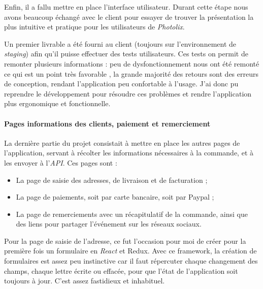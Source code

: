 \documentclass[12pt,a4paper]{article}
\providecommand{\tightlist}{%
  \setlength{\itemsep}{0pt}\setlength{\parskip}{0pt}}
\begin{document}
  Enfin, il a fallu mettre en place l'interface utilisateur. Durant cette
  étape nous avons beaucoup échangé avec le client pour essayer de trouver
  la présentation la plus intuitive et pratique pour les utilisateurs de
  \emph{Photolix}.

  Un premier livrable a été fourni au client (toujours sur l'environnement
  de \emph{staging}) afin qu'il puisse effectuer des tests utilisateurs.
  Ces tests on permit de remonter plusieurs informations : peu de
  dysfonctionnement nous ont été remonté ce qui est un point très
  favorable , la grande majorité des retours sont des erreurs de
  conception, rendant l'application peu confortable à l'usage. J'ai donc
  pu reprendre le développement pour résoudre ces problèmes et rendre
  l'application plus ergonomique et fonctionnelle.

  \paragraph{Pages informations des clients, paiement et
  remerciement}\label{pages-informations-des-clients-paiement-et-remerciement}

  \bigskip

  La dernière partie du projet consistait à mettre en place les autres
  pages de l'application, servant à récolter les informations nécessaires
  à la commande, et à les envoyer à l'\emph{API}. Ces pages sont :

  \begin{itemize}
  \tightlist
  \item
    La page de saisie des adresses, de livraison et de facturation ;
  \item
    La page de paiements, soit par carte bancaire, soit par Paypal ;
  \item
    La page de remerciements avec un récapitulatif de la commande, ainsi
    que des liens pour partager l'événement sur les réseaux sociaux.
  \end{itemize}

  \bigskip

  Pour la page de saisie de l'adresse, ce fut l'occasion pour moi de créer
  pour la première fois un formulaire en \emph{React} et Redux. Avec ce
  framework, la création de formulaires est assez peu instinctive car il
  faut répercuter chaque changement des champs, chaque lettre écrite ou
  effacée, pour que l'état de l'application soit toujours à jour. C'est
  assez fastidieux et inhabituel.

  \bigskip
\end{document}
